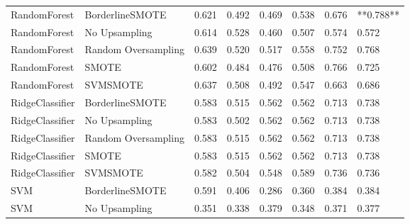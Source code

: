 \begin{tabular}{llllllll}
                RandomForest &     BorderlineSMOTE & 0.621 &                     0.492 &                 0.469 &                  0.538 &                                   0.676 & **0.788** \\
                RandomForest &       No Upsampling & 0.614 &                     0.528 &                 0.460 &                  0.507 &                                   0.574 &     0.572 \\
                RandomForest & Random Oversampling & 0.639 &                     0.520 &                 0.517 &                  0.558 &                                   0.752 &     0.768 \\
                RandomForest &               SMOTE & 0.602 &                     0.484 &                 0.476 &                  0.508 &                                   0.766 &     0.725 \\
                RandomForest &            SVMSMOTE & 0.637 &                     0.508 &                 0.492 &                  0.547 &                                   0.663 &     0.686 \\
             RidgeClassifier &     BorderlineSMOTE & 0.583 &                     0.515 &                 0.562 &                  0.562 &                                   0.713 &     0.738 \\
             RidgeClassifier &       No Upsampling & 0.583 &                     0.502 &                 0.562 &                  0.562 &                                   0.713 &     0.738 \\
             RidgeClassifier & Random Oversampling & 0.583 &                     0.515 &                 0.562 &                  0.562 &                                   0.713 &     0.738 \\
             RidgeClassifier &               SMOTE & 0.583 &                     0.515 &                 0.562 &                  0.562 &                                   0.713 &     0.738 \\
             RidgeClassifier &            SVMSMOTE & 0.582 &                     0.504 &                 0.548 &                  0.589 &                                   0.736 &     0.736 \\
                         SVM &     BorderlineSMOTE & 0.591 &                     0.406 &                 0.286 &                  0.360 &                                   0.384 &     0.384 \\
                         SVM &       No Upsampling & 0.351 &                     0.338 &                 0.379 &                  0.348 &                                   0.371 &     0.377 \\

\end{tabular}
